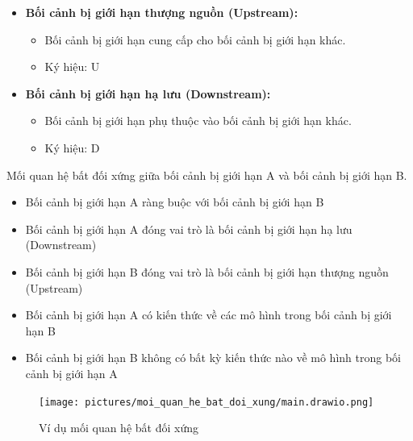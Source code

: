 \begin{itemize}

    \item \textbf{Bối cảnh bị giới hạn thượng nguồn (Upstream):}

          \begin{itemize}

              \item Bối cảnh bị giới hạn cung cấp cho bối cảnh bị giới hạn khác.

              \item Ký hiệu: U

          \end{itemize}

    \item \textbf{Bối cảnh bị giới hạn hạ lưu (Downstream):}

          \begin{itemize}

              \item Bối cảnh bị giới hạn phụ thuộc vào bối cảnh bị giới hạn khác.

              \item Ký hiệu: D

          \end{itemize}

\end{itemize}

\begin{example} Mối quan hệ bất đối xứng giữa bối cảnh bị giới hạn A và bối cảnh bị giới hạn B.

    \begin{itemize}

        \item Bối cảnh bị giới hạn A ràng buộc với bối cảnh bị giới hạn B

        \item Bối cảnh bị giới hạn A đóng vai trò là bối cảnh bị giới hạn hạ lưu (Downstream)

        \item Bối cảnh bị giới hạn B đóng vai trò là bối cảnh bị giới hạn thượng nguồn (Upstream)

        \item Bối cảnh bị giới hạn A có kiến thức về các mô hình trong bối cảnh bị giới hạn B

        \item Bối cảnh bị giới hạn B không có bất kỳ kiến thức nào về mô hình trong bối cảnh bị giới hạn A

    \end{itemize}

    \begin{figure}[H]

        \centering

        \texttt{[image: pictures/moi\_quan\_he\_bat\_doi\_xung/main.drawio.png]}

        \caption{Ví dụ mối quan hệ bất đối xứng}

    \end{figure}

\end{example}


